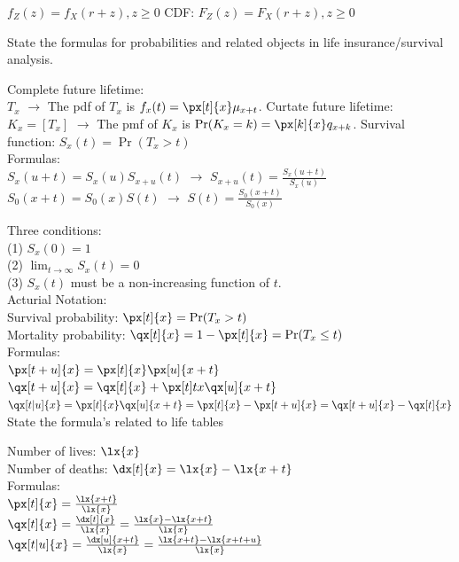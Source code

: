 \documentclass[11pt,a4paper,twoside]{article}
\begin{document}
$f_Z(z) = f_X(r + z), z \geq 0$
CDF:
$F_Z(z) = F_X(r + z), z \geq 0$


State the formulas for probabilities and related objects in life insurance/survival analysis.

Complete future lifetime: \\
$T_x$ $\rightarrow$ The pdf of $T_x$ is $f_x(t) = \px[t]{x} \mu_{x+t}$. 
\newline
Curtate future lifetime: \\
$K_x = [T_x]$ $\rightarrow$ The pmf of $K_x$ is $\Pr(K_x = k) =  \px[k]{x} q_{x+k}$.
\newline
Survival function: $S_x(t) = \Pr(T_x > t)$ \\
Formulas: \\
$S_x(u+t) = S_x(u) S_{x+u}(t)$ $\rightarrow$ $S_{x+u}(t) = \frac{S_x(u+t)}{S_x(u)}$ \\
$S_0(x+t) = S_0(x) S(t)$ $\rightarrow$ $S(t) = \frac{S_0(x+t)}{S_0(x)}$
\newline

Three conditions: \\
(1) $S_x(0) = 1$ \\
(2) $\lim_{t \to \infty} S_x(t) = 0$ \\
(3) $S_x(t)$ must be a non-increasing function of $t$. \\
\newline
Acturial Notation: \\
Survival probability: $ \px[t]{x} = \Pr(T_x > t) $ \\
Mortality probability: $ \qx[t]{x} = 1 - \px[t]{x} = \Pr(T_x \leq t) $ \\
Formulas: \\
$ \px[t+u]{x} = \px[t]{x} \px[u]{x+t} $ \\
$ \qx[t+u]{x} = \qx[t]{x} + \px[t]t{x} \qx[u]{x+t}$ \\
$ \qx[t|u]{x} = \px[t]{x}\qx[u]{x+t} = \px[t]{x} - \px[t+u]{x} = \qx[t+u]{x} - \qx[t]{x} $ \\


State the formula's related to life tables

Number of lives: $ \lx{x} $ \\
Number of deaths: $ \dx[t]{x} = \lx{x} - \lx{x+t} $ \\
Formulas: \\
$ \px[t]{x} = \frac{\lx{x+t}}{\lx{x}} $ \\
$ \qx[t]{x} = \frac{\dx[t]{x}}{\lx{x}} = \frac{\lx{x} - \lx{x+t}}{\lx{x}} $ \\
$ \qx[t|u]{x} = \frac{\dx[u]{x+t}}{\lx{x}} = \frac{\lx{x + t} - \lx{x+t+u}}{\lx{x}} $
\end{document}
